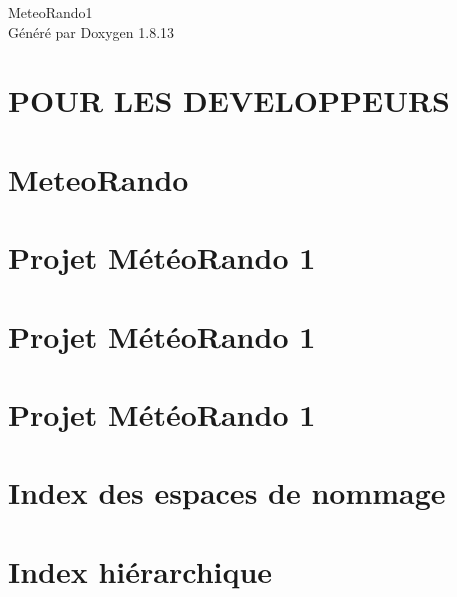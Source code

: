 \documentclass[twoside]{book}
\newcommand{\+}{\discretionary{\mbox{\scriptsize$\hookleftarrow$}}{}{}}
\newcommand{\clearemptydoublepage}{%
  \newpage{\pagestyle{empty}\cleardoublepage}%
}
\begin{document}
\hypersetup{pageanchor=false,
             bookmarksnumbered=true,
             pdfencoding=unicode
            }
\begin{titlepage}
\vspace*{7cm}
\begin{center}%
{\Large Meteo\+Rando1 }\\
\vspace*{1cm}
{\large Généré par Doxygen 1.8.13}\\
\end{center}
\end{titlepage}
\clearemptydoublepage
{}
\tableofcontents
\clearemptydoublepage
{}
\hypersetup{pageanchor=true}

\chapter{P\+O\+UR L\+ES D\+E\+V\+E\+L\+O\+P\+P\+E\+U\+RS}
\label{md_developper}

\chapter{Meteo\+Rando}
\label{md_README}

\chapter{Projet Météo\+Rando 1}
\label{md_sprints_sprint1}

\chapter{Projet Météo\+Rando 1}
\label{md_sprints_sprint2}

\chapter{Projet Météo\+Rando 1}
\label{md_sprints_sprint3}

\chapter{Index des espaces de nommage}

\chapter{Index hiérarchique}

\end{document}
